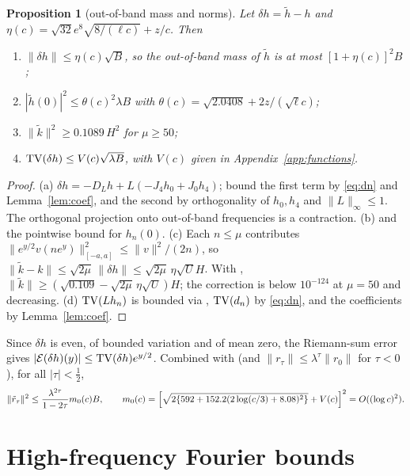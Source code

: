 \documentclass[11pt]{amsart}
\newtheorem{proposition}{Proposition}[section]
\theoremstyle{remark}
\numberwithin{equation}{section}
\newcommand{\E}{\mathcal{E}}
\begin{document}
\begin{proposition}[out-of-band mass and norms]\label{prop:oob}
Let $\delta h=\tilde h-h$ and $\eta(c)=\sqrt{32}e^8\sqrt{8/(\ell c)}+z/c$. Then
\begin{enumerate}
\item[(a)] $\|\delta h\|\le\eta(c)\sqrt B$, so the out-of-band mass of $\tilde h$ is at most $[1+\eta(c)]^2B$;
\item[(b)] $|\tilde h(0)|^2\le\theta(c)^2\lambda B$ with $\theta(c)=\sqrt{2.0408}+2z/(\sqrt\ell c)$;
\item[(c)] $\|\tilde k\|^2\ge0.1089\,H^2$ for $\mu\ge50$;
\item[(d)] ${\rm TV}(\delta h)\le V(c)\sqrt{\lambda B}$, with $V(c)$ given in Appendix~\ref{app:functions}.
\end{enumerate}
\end{proposition}
\begin{proof}
(a) $\delta h=-D_Lh+L(-J_4h_0+J_0h_4)$; bound the first term by \eqref{eq:dn} and Lemma~\ref{lem:coef}, and the second by orthogonality of $h_0,h_4$ and $\|L\|_\infty\le1$. The orthogonal projection onto out-of-band frequencies is a contraction.
(b) \cite[Lemma~3.4]{MoriWeilII} and the pointwise bound for $h_n(0)$.
(c) Each $n\le\mu$ contributes $\|e^{y/2}v(ne^y)\|^2_{[-a,a]}\le\|v\|^2/(2n)$, so $\|\tilde k-k\|\le\sqrt{2\mu}\,\|\delta h\|\le\sqrt{2\mu}\,\eta\sqrt{U}H$. With \cite[Thm.~D]{MoriWeilII}, $\|\tilde k\|\ge(\sqrt{0.109}-\sqrt{2\mu}\,\eta\sqrt U)H$; the correction is below $10^{-124}$ at $\mu=50$ and decreasing.
(d) ${\rm TV}(Lh_n)$ is bounded via \cite[Lemma~3.1]{MoriWeilII}, ${\rm TV}(d_n)$ by \eqref{eq:dn}, and the coefficients by Lemma~\ref{lem:coef}.
\end{proof}

Since $\delta h$ is even, of bounded variation and of mean zero, the Riemann-sum error gives $|\E(\delta h)(y)|\le{\rm TV}(\delta h)e^{y/2}$. Combined with \cite[Lemma~4.1]{MoriWeilII} (and $\|r_\tau\|\le\lambda^{\tau}\|r_0\|$ for $\tau<0$), for all $|\tau|<\frac12$,
\begin{equation}\label{eq:m0}
\|\tilde r_\tau\|^2\le\frac{\lambda^{2\tau}}{1-2\tau}m_0(c)B,\qquad m_0(c)=\Bigl[\sqrt{2\{592+152.2(2\log(c/3)+8.08)^2\}}+V(c)\Bigr]^2=O((\log c)^2).
\end{equation}

\section{High-frequency Fourier bounds}\label{sec:fourier}
\end{document}
